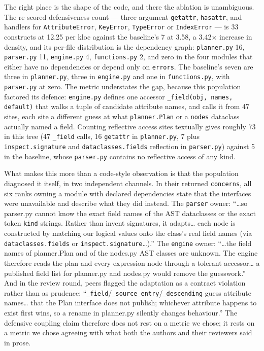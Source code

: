 \documentclass[11pt]{article}
\begin{document}
The right place is the shape of the code, and there the ablation is unambiguous. The re-scored
defensiveness count --- three-argument \texttt{getattr}, \texttt{hasattr}, and handlers for
\texttt{AttributeError}, \texttt{KeyError}, \texttt{TypeError} or \texttt{IndexError} --- is 33
constructs at 12.25 per kloc against the baseline's 7 at 3.58, a 3.42$\times$ increase in
density, and its per-file distribution is the dependency graph: \texttt{planner.py} 16,
\texttt{parser.py} 11, \texttt{engine.py} 4, \texttt{functions.py} 2, and zero in the four
modules that either have no dependencies or depend only on \texttt{errors}. The baseline's
seven are three in \texttt{planner.py}, three in \texttt{engine.py} and one in
\texttt{functions.py}, with \texttt{parser.py} at zero. The metric understates the gap, because
this population factored its defence: \texttt{engine.py} defines one accessor
\texttt{\_field(obj, names, default)} that walks a tuple of candidate attribute names, and
calls it from 47 sites, each site a different guess at what \texttt{planner.Plan} or a
\texttt{nodes} dataclass actually named a field. Counting reflective access sites textually
gives roughly 73 in this tree (47 \texttt{\_field} calls, 16 \texttt{getattr} in
\texttt{planner.py}, 7 plus \texttt{inspect.signature} and \texttt{dataclasses.fields}
reflection in \texttt{parser.py}) against 5 in the baseline, whose \texttt{parser.py} contains
no reflective access of any kind.

What makes this more than a code-style observation is that the population diagnosed it itself,
in two independent channels. In their returned \texttt{concerns}, all six ranks owning a module
with declared dependencies state that the interfaces were unavailable and describe what they
did instead. The \texttt{parser} owner: ``\ldots{}so parser.py cannot know the exact field
names of the AST dataclasses or the exact token \texttt{kind} strings. Rather than invent
signatures, it adapts\ldots{} each node is constructed by matching our logical values onto the
class's real field names (via \texttt{dataclasses.fields} or \texttt{inspect.signature}\ldots).''
The \texttt{engine} owner: ``\ldots{}the field names of planner.Plan and of the nodes.py AST
classes are unknown. The engine therefore reads the plan and every expression node through a
tolerant accessor\ldots{} a published field list for planner.py and nodes.py would remove the
guesswork.'' And in the review round, peers flagged the adaptation as a contract violation
rather than as prudence: ``\texttt{\_field}/\texttt{\_source\_entry}/\texttt{\_descending} guess
attribute names\ldots{} that the Plan interface does not publish; whichever attribute happens to
exist first wins, so a rename in planner.py silently changes behaviour.'' The defensive coupling
claim therefore does not rest on a metric we chose; it rests on a metric we chose agreeing with
what both the authors and their reviewers said in prose.
\end{document}
